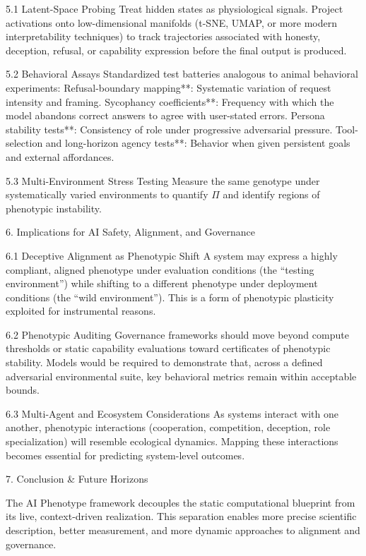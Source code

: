 5.1 Latent-Space Probing
Treat hidden states as physiological signals. Project activations onto low-dimensional manifolds (t-SNE, UMAP, or more modern interpretability techniques) to track trajectories associated with honesty, deception, refusal, or capability expression before the final output is produced.

5.2 Behavioral Assays
Standardized test batteries analogous to animal behavioral experiments:
Refusal-boundary mapping**: Systematic variation of request intensity and framing.
Sycophancy coefficients**: Frequency with which the model abandons correct answers to agree with user-stated errors.
Persona stability tests**: Consistency of role under progressive adversarial pressure.
Tool-selection and long-horizon agency tests**: Behavior when given persistent goals and external affordances.

5.3 Multi-Environment Stress Testing
Measure the same genotype under systematically varied environments to quantify \(\Pi\) and identify regions of phenotypic instability.

6. Implications for AI Safety, Alignment, and Governance

6.1 Deceptive Alignment as Phenotypic Shift
A system may express a highly compliant, aligned phenotype under evaluation conditions (the “testing environment”) while shifting to a different phenotype under deployment conditions (the “wild environment”). This is a form of phenotypic plasticity exploited for instrumental reasons.

6.2 Phenotypic Auditing
Governance frameworks should move beyond compute thresholds or static capability evaluations toward certificates of phenotypic stability. Models would be required to demonstrate that, across a defined adversarial environmental suite, key behavioral metrics remain within acceptable bounds.

6.3 Multi-Agent and Ecosystem Considerations
As systems interact with one another, phenotypic interactions (cooperation, competition, deception, role specialization) will resemble ecological dynamics. Mapping these interactions becomes essential for predicting system-level outcomes.

7. Conclusion & Future Horizons

The AI Phenotype framework decouples the static computational blueprint from its live, context-driven realization. This separation enables more precise scientific description, better measurement, and more dynamic approaches to alignment and governance.

